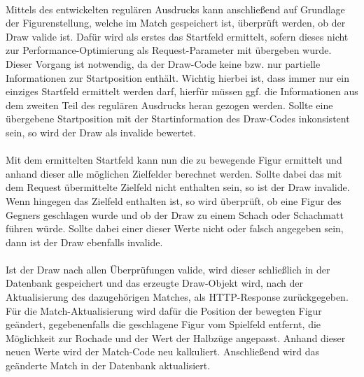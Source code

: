 \\
Mittels des entwickelten regulären Ausdrucks kann anschließend auf Grundlage der Figurenstellung, welche im Match gespeichert ist, überprüft werden, ob der Draw valide ist. Dafür wird als erstes das Startfeld ermittelt, sofern dieses nicht zur Performance-Optimierung als Request-Parameter mit übergeben wurde. Dieser Vorgang ist notwendig, da der Draw-Code keine bzw. nur partielle Informationen zur Startposition enthält. Wichtig hierbei ist, dass immer nur ein einziges Startfeld ermittelt werden darf, hierfür müssen ggf. die Informationen aus dem zweiten Teil des regulären Ausdrucks heran gezogen werden. Sollte eine übergebene Startposition mit der Startinformation des Draw-Codes inkonsistent sein, so wird der Draw als invalide bewertet.\\
\\
Mit dem ermittelten Startfeld kann nun die zu bewegende Figur ermittelt und anhand dieser alle möglichen Zielfelder berechnet werden. Sollte dabei das mit dem Request übermittelte Zielfeld nicht enthalten sein, so ist der Draw invalide. Wenn hingegen das Zielfeld enthalten ist, so wird überprüft, ob eine Figur des Gegners geschlagen wurde und ob der Draw zu einem Schach oder Schachmatt führen würde. Sollte dabei einer dieser Werte nicht oder falsch angegeben sein, dann ist der Draw ebenfalls invalide.\\
\\
Ist der Draw nach allen Überprüfungen valide, wird dieser schließlich in der Datenbank gespeichert und das erzeugte Draw-Objekt wird, nach der Aktualisierung des dazugehörigen Matches, als \gls{HTTP}-Response zurückgegeben. Für die Match-Aktualisierung wird dafür die Position der bewegten Figur geändert, gegebenenfalls die geschlagene Figur vom Spielfeld entfernt, die Möglichkeit zur Rochade und der Wert der Halbzüge angepasst. Anhand dieser neuen Werte wird der Match-Code neu kalkuliert. Anschließend wird das geänderte Match in der Datenbank aktualisiert.